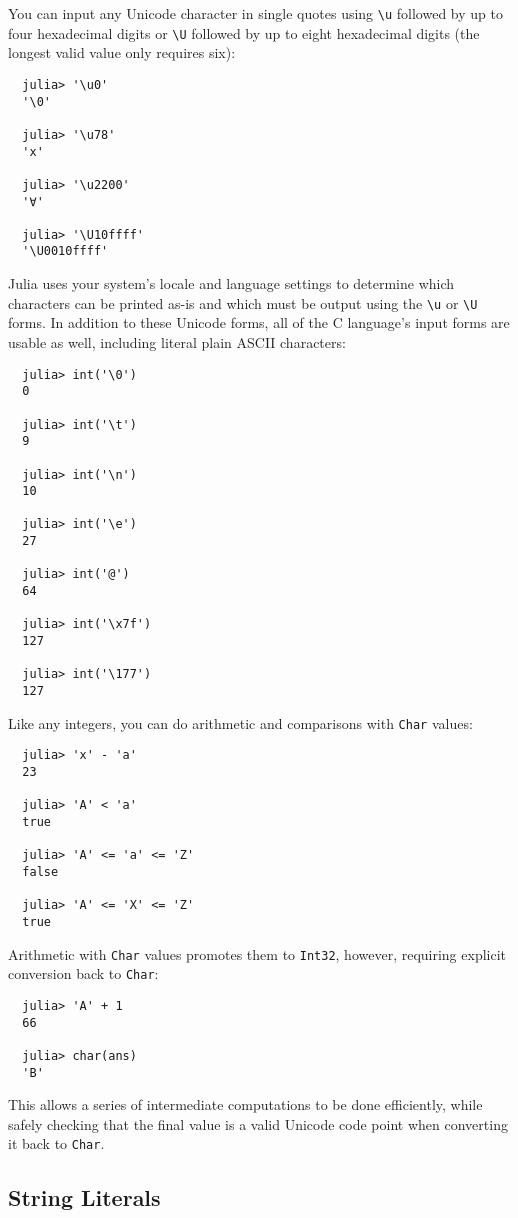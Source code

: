 \documentclass{article}
\begin{document}
You can input any Unicode character in single quotes using \verb|\u| followed by up to four hexadecimal digits or \verb|\U| followed by up to eight hexadecimal digits (the longest valid value only requires six):
\begin{verbatim}
  julia> '\u0'
  '\0'

  julia> '\u78'
  'x'

  julia> '\u2200'
  '∀'

  julia> '\U10ffff'
  '\U0010ffff'
\end{verbatim}
Julia uses your system's locale and language settings to determine which characters can be printed as-is and which must be output using the \verb|\u| or \verb|\U| forms.
In addition to these Unicode forms, all of the C language's input forms are usable as well, including literal plain ASCII characters:
\begin{verbatim}
  julia> int('\0')
  0

  julia> int('\t')
  9

  julia> int('\n')
  10

  julia> int('\e')
  27

  julia> int('@')
  64

  julia> int('\x7f')
  127

  julia> int('\177')
  127
\end{verbatim}
Like any integers, you can do arithmetic and comparisons with \verb|Char| values:
\begin{verbatim}
  julia> 'x' - 'a'
  23

  julia> 'A' < 'a'
  true

  julia> 'A' <= 'a' <= 'Z'
  false

  julia> 'A' <= 'X' <= 'Z'
  true
\end{verbatim}
Arithmetic with \verb|Char| values promotes them to \verb|Int32|, however, requiring explicit conversion back to \verb|Char|:
\begin{verbatim}
  julia> 'A' + 1
  66

  julia> char(ans)
  'B'
\end{verbatim}
This allows a series of intermediate computations to be done efficiently, while safely checking that the final value is a valid Unicode code point when converting it back to \verb|Char|.

\subsection{String Literals}
\end{document}
